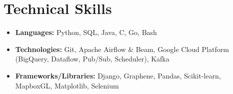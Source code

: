 \documentclass[letterpaper,11pt]{article}
\newcommand{\resumeItem}[2]{
  \item\small{
    \textbf{#1}{ #2 \vspace{-2pt}}
  }
}
\newcommand{\resumeSubItem}[2]{\resumeItem{#1}{#2}\vspace{-4pt}}
\newcommand{\resumeSubHeadingListStart}{\begin{itemize}[leftmargin=*]}
\newcommand{\resumeSubHeadingListEnd}{\end{itemize}}
\begin{document}
%
\section{Technical Skills}
 \resumeSubHeadingListStart
    \resumeSubItem{Languages:}
      {Python, SQL, Java, C, Go, Bash}
    \resumeSubItem{Technologies:}
      {Git, Apache Airflow \& Beam, Google Cloud Platform (BigQuery, Dataflow, Pub/Sub, Scheduler), Kafka}
    \resumeSubItem{Frameworks/Libraries:}
      {Django, Graphene, Pandas, Scikit-learn, MapboxGL, Matplotlib, Selenium}
 \resumeSubHeadingListEnd

\end{document}

